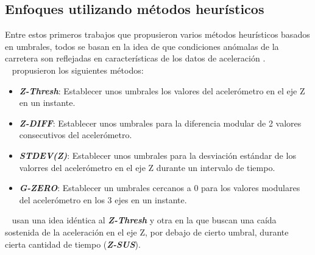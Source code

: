 	\subsection{Enfoques utilizando métodos heurísticos}
		Entre estos primeros trabajos que propusieron varios métodos heurísticos basados en umbrales, todos se basan en la idea
		de que condiciones anómalas de la carretera son reflejadas en características de los datos de aceleración .\\
		~\textcite{mednis2011real} propusieron los siguientes métodos:\\

		\begin{itemize}
			\item  \emph{\textbf {Z-Thresh}}: Establecer unos umbrales los valores del acelerómetro en el eje Z en un instante.\\
			\item \emph{\textbf {Z-DIFF}}: Establecer unos umbrales para la diferencia modular de 2 valores consecutivos del
				acelerómetro.\\
			\item \emph{\textbf {STDEV(Z)}}: Establecer unos umbrales para la desviación estándar de los valorres del acelerómetro en
				el eje Z durante un intervalo de tiempo.\\ 
			\item \emph{\textbf {G-ZERO}}: Establecer un umbrales cercanos a 0 para los valores modulares del acelerómetro
				en los 3 ejes en un instante.\\
		\end{itemize}

		~\textcite{mohan2008nericell} usan una idea idéntica al \emph{\textbf{Z-Thresh}} y otra en la que buscan una caída sostenida de la 
		aceleración en el eje Z, por debajo de cierto umbral, durante cierta cantidad de tiempo (\emph{\textbf{Z-SUS}}).\\


